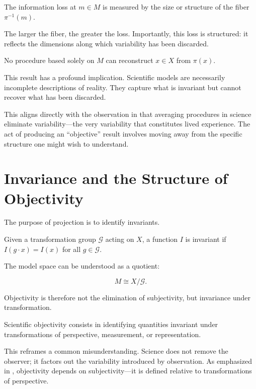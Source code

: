 \documentclass[11pt,openany]{book}
\begin{document}
\begin{definition}
The information loss at $m \in M$ is measured by the size or structure of the fiber $\pi^{-1}(m)$.
\end{definition}

The larger the fiber, the greater the loss. Importantly, this loss is structured: it reflects the dimensions along which variability has been discarded.

\begin{proposition}[Irreversibility]
No procedure based solely on $M$ can reconstruct $x \in X$ from $\pi(x)$.
\end{proposition}

This result has a profound implication. Scientific models are necessarily incomplete descriptions of reality. They capture what is invariant but cannot recover what has been discarded.

This aligns directly with the observation in  that averaging procedures in science eliminate variability—the very variability that constitutes lived experience. The act of producing an “objective” result involves moving away from the specific structure one might wish to understand.

\section{Invariance and the Structure of Objectivity}
\label{sec:invariance}

The purpose of projection is to identify invariants.

\begin{definition}[Invariant]
Given a transformation group $\mathcal{G}$ acting on $X$, a function $I$ is invariant if $I(g \cdot x) = I(x)$ for all $g \in \mathcal{G}$.
\end{definition}

The model space can be understood as a quotient:

$$
M \cong X / \mathcal{G}.
$$

Objectivity is therefore not the elimination of subjectivity, but invariance under transformation.

\begin{proposition}
Scientific objectivity consists in identifying quantities invariant under transformations of perspective, measurement, or representation.
\end{proposition}

This reframes a common misunderstanding. Science does not remove the observer; it factors out the variability introduced by observation. As emphasized in , objectivity depends on subjectivity—it is defined relative to transformations of perspective.
\end{document}
